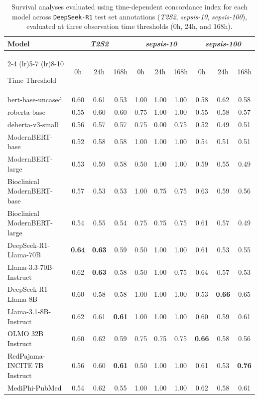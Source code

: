 \begin{table}[!hbtp]
\centering
{
\begin{tabular}{lccccccccc}
\toprule
\textbf{Model} 
& \multicolumn{3}{c}{\textit{T2S2}} 
& \multicolumn{3}{c}{\textit{sepsis-10}} 
& \multicolumn{3}{c}{\textit{sepsis-100}} \\
\cmidrule(lr){2-4} \cmidrule(lr){5-7} \cmidrule(lr){8-10}

Time Threshold & 0h & 24h & 168h 
& 0h & 24h & 168h 
& 0h & 24h & 168h \\
\midrule
bert-base-uncased       & 0.60 & 0.61 & 0.53 & 1.00 & 1.00 & 1.00 & 0.58 & 0.62 & 0.58 \\
roberta-base            & 0.55 & 0.60 & 0.60 & 0.75 & 1.00 & 1.00 & 0.55 & 0.58 & 0.57 \\
deberta-v3-small        & 0.56 & 0.57 & 0.57 & 0.75 & 0.00 & 0.75 & 0.52 & 0.49 & 0.51 \\
ModernBERT-base         & 0.52 & 0.58 & 0.58 & 1.00 & 1.00 & 1.00 & 0.54 & 0.51 & 0.51 \\
ModernBERT-large        & 0.53 & 0.59 & 0.58 & 0.50 & 1.00 & 1.00 & 0.59 & 0.55 & 0.49 \\
\textcolor{black}{Bioclinical ModernBERT-base} & 0.57& 0.53& 0.53& 1.00& 0.75& 0.75& 0.63& 0.59& 0.56\\
\textcolor{black}{Bioclinical ModernBERT-large} & 0.54& 0.55 & 0.54 & 0.75 & 0.75 & 0.75& 0.61 & 0.57 & 0.49\\
DeepSeek-R1-Llama-70B   & \textbf{0.64} & \textbf{0.63} & 0.59 & 0.50 & 1.00 & 1.00 & 0.61 & 0.53 & 0.55 \\
Llama-3.3-70B-Instruct  & 0.62 & \textbf{0.63} & 0.58 & 0.50 & 1.00 & 0.75 & 0.64 & 0.57 & 0.53 \\
DeepSeek-R1-Llama-8B    & 0.60 & 0.58 & 0.58 & 1.00 & 1.00 & 1.00 & 0.53 & \textbf{0.66} & {0.65} \\
Llama-3.1-8B-Instruct   & 0.62 & 0.61 & \textbf{0.61} & 1.00 & 1.00 & 1.00 & 0.60 & 0.59 & 0.61 \\
\textcolor{black}{OLMO 32B Instruct} & 0.60& 0.62 & 0.59 & 0.75 & 0.75 & 0.75&\textbf{ 0.66} & 0.58 & 0.56\\
\textcolor{black}{RedPajama-INCITE 7B Instruct} & 0.56&  0.60 & \textbf{0.61} & 0.50 & 1.00 & 1.00& 0.61 & 0.53 & \textbf{0.76}\\
\textcolor{black}{MediPhi-PubMed} & 0.54 & 0.62 & 0.55 & 1.00 & 1.00 & 1.00& 0.62 & 0.58 & 0.61\\
\bottomrule
\end{tabular}
}
\caption{Survival analyses evaluated using time-dependent concordance index for each model across \texttt{DeepSeek-R1} test set annotations (\textit{T2S2}, \textit{sepsis-10}, \textit{sepsis-100}), evaluated at three observation time thresholds (0h, 24h, and 168h).
\vspace{-0.75em}
}
\label{tab:concordance_wide}
\end{table}